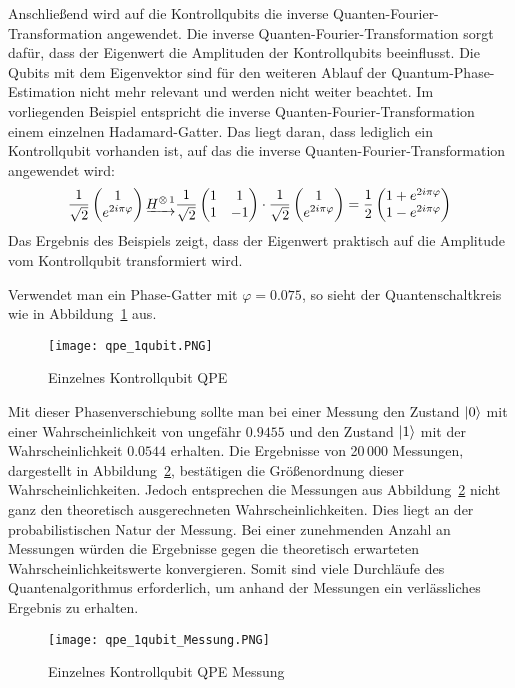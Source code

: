 Anschließend wird auf die Kontrollqubits die inverse Quanten-Fourier-Transformation angewendet.
Die inverse Quanten-Fourier-Transformation sorgt dafür, 
dass der Eigenwert die Amplituden der Kontrollqubits beeinflusst.
Die Qubits mit dem Eigenvektor sind für den weiteren Ablauf der Quantum-Phase-Estimation nicht mehr relevant 
und werden nicht weiter beachtet.
Im vorliegenden Beispiel entspricht die inverse Quanten-Fourier-Transformation einem einzelnen Hadamard-Gatter. 
Das liegt daran, dass lediglich ein Kontrollqubit vorhanden ist, 
auf das die inverse Quanten-Fourier-Transformation angewendet wird:
\[
\frac{1}{\sqrt{2}}
\begin{pmatrix}
  1 \\
  e^{2 i \pi \varphi}
 \end{pmatrix}
 \underrightarrow{H^{\operatorname{\otimes}1}}
 \frac{1}{\sqrt{2}}
 \begin{pmatrix}
  1 & 1\\
  1 & -1
 \end{pmatrix}
 \cdot
 \frac{1}{\sqrt{2}}
\begin{pmatrix}
  1 \\
  e^{2 i \pi \varphi}
 \end{pmatrix}
 =
 \frac{1}{2}
 \begin{pmatrix}
  1 + e^{2 i \pi \varphi}\\
  1 - e^{2 i \pi \varphi}
 \end{pmatrix}
\]
Das Ergebnis des Beispiels zeigt, dass der Eigenwert praktisch auf die Amplitude vom Kontrollqubit transformiert wird.

Verwendet man ein Phase-Gatter mit \(\varphi  = 0.075\), 
so sieht der Quantenschaltkreis wie in Abbildung~\ref{fig:qpe_1qubit} aus.
\begin{figure}[H]
  \centering
  \texttt{[image: qpe\_1qubit.PNG]}
  \caption{Einzelnes Kontrollqubit QPE}
  \label{fig:qpe_1qubit}
\end{figure}
Mit dieser Phasenverschiebung sollte man bei einer Messung den Zustand \(\ket{0}\)
mit einer Wahrscheinlichkeit von ungefähr \(0.9455\) 
und den Zustand \(\ket{1}\) mit der Wahrscheinlichkeit \(0.0544\) erhalten.
Die Ergebnisse von 20\,000 Messungen, dargestellt in Abbildung~\ref{fig:qpe_1qubit_Messung}, 
bestätigen die Größenordnung dieser Wahrscheinlichkeiten.
Jedoch entsprechen die Messungen aus Abbildung~\ref{fig:qpe_1qubit_Messung} nicht ganz den theoretisch ausgerechneten Wahrscheinlichkeiten.
Dies liegt an der probabilistischen Natur der Messung.
Bei einer zunehmenden Anzahl an Messungen würden die Ergebnisse gegen die theoretisch erwarteten Wahrscheinlichkeitswerte konvergieren.
Somit sind viele Durchläufe des Quantenalgorithmus erforderlich, 
um anhand der Messungen ein verlässliches Ergebnis zu erhalten.
\begin{figure}[H]
  \caption{Einzelnes Kontrollqubit QPE Messung}
  \label{fig:qpe_1qubit_Messung}
  \texttt{[image: qpe\_1qubit\_Messung.PNG]}
  \centering
  \end{figure}
  

